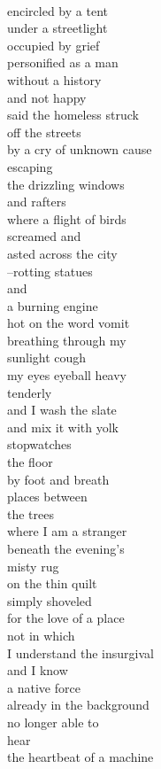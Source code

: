 \documentclass[smalldemyvopaper,11pt,twoside,onecolumn,openright,extrafontsizes]{memoir}
\begin{document}
\\encircled by a tent
\\under a streetlight
\\occupied by grief
\\personified as a man
\\without a history
\\and not happy
\\said the homeless struck
\\off the streets
\\by a cry of unknown cause
\\escaping
\\the drizzling windows
\\and rafters
\\where a flight of birds
\\screamed and
\\asted across the city
\\--rotting statues
\\and
\\a burning engine
\\hot on the word vomit
\\breathing through my
\\sunlight cough
\\my eyes eyeball heavy
\\tenderly
\\and I wash the slate
\\and mix it with yolk
\\stopwatches
\\the floor
\\by foot and breath
\\places between
\\the trees
\\where I am a stranger
\\beneath the evening's
\\misty rug
\\on the thin quilt
\\simply shoveled
\\for the love of a place
\\not in which
\\I understand the insurgival
\\and I know
\\a native force
\\already in the background
\\no longer able to
\\hear
\\the heartbeat of a machine
\end{document}
